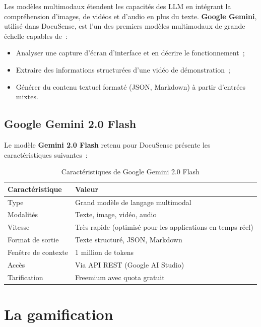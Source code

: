 \documentclass[12pt, a4paper, twoside, openany]{report}
\begin{document}
Les mod\`eles multimodaux \'etendent les capacit\'es des LLM en int\'egrant la
compr\'ehension d'images, de vid\'eos et d'audio en plus du texte.
\textbf{Google Gemini}, utilis\'e dans DocuSense, est l'un des premiers mod\`eles
multimodaux de grande \'echelle capables de~:
\begin{itemize}
  \item Analyser une capture d'\'ecran d'interface et en d\'ecrire le fonctionnement~;
  \item Extraire des informations structur\'ees d'une vid\'eo de d\'emonstration~;
  \item G\'en\'erer du contenu textuel format\'e (JSON, Markdown) \`a partir
        d'entr\'ees mixtes.
\end{itemize}

\subsection{Google Gemini 2.0 Flash}

Le mod\`ele \textbf{Gemini 2.0 Flash} retenu pour DocuSense pr\'esente les
caract\'eristiques suivantes~:

\begin{table}[H]
  \centering
  \caption{Caract\'eristiques de Google Gemini 2.0 Flash}
  \label{tab:gemini}
  \begin{tabularx}{\textwidth}{l X}
    \toprule
    \textbf{Caract\'eristique} & \textbf{Valeur} \\
    \midrule
    Type             & Grand mod\`ele de langage multimodal \\
    Modalit\'es      & Texte, image, vid\'eo, audio \\
    Vitesse          & Tr\`es rapide (optimis\'e pour les applications en temps r\'eel) \\
    Format de sortie & Texte structur\'e, JSON, Markdown \\
    Fen\^etre de contexte & 1 million de tokens \\
    Acc\`es          & Via API REST (Google AI Studio) \\
    Tarification     & Freemium avec quota gratuit \\
    \bottomrule
  \end{tabularx}
\end{table}

\section{La gamification}
\end{document}
